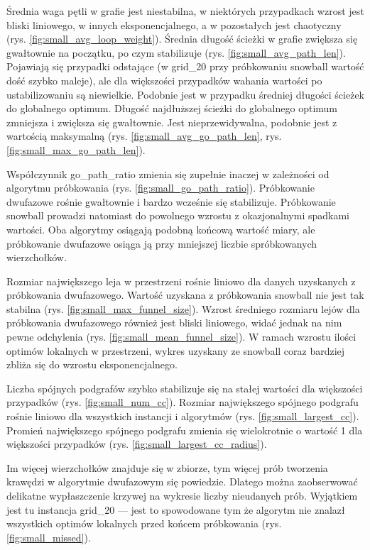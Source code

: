 Średnia waga pętli w grafie jest niestabilna, w niektórych przypadkach wzrost jest bliski liniowego, w innych
eksponencjalnego, a w pozostałych jest chaotyczny (rys. \ref{fig:small_avg_loop_weight}).
Średnia długość ścieżki w grafie zwiększa się gwałtownie na początku, po czym stabilizuje (rys. \ref{fig:small_avg_path_len}).
Pojawiają się przypadki odstające (w grid\_20 przy próbkowaniu snowball wartość dość szybko maleje),
ale dla większości przypadków wahania wartości po ustabilizowaniu są niewielkie.
Podobnie jest w przypadku średniej długości ścieżek do globalnego optimum.
Długość najdłuższej ścieżki do globalnego optimum zmniejsza i zwiększa się gwałtownie.
Jest nieprzewidywalna, podobnie jest z wartością maksymalną (rys. \ref{fig:small_avg_go_path_len}, rys. \ref{fig:small_max_go_path_len}).

Współczynnik go\_path\_ratio zmienia się zupełnie inaczej w zależności od algorytmu próbkowania (rys. \ref{fig:small_go_path_ratio}).
Próbkowanie dwufazowe rośnie gwałtownie i bardzo wcześnie się stabilizuje.
Próbkowanie snowball prowadzi natomiast do powolnego wzrostu z okazjonalnymi spadkami wartości.
Oba algorytmy osiągają podobną końcową wartość miary, ale próbkowanie dwufazowe osiąga ją przy mniejszej
liczbie spróbkowanych wierzchołków.

Rozmiar największego leja w przestrzeni rośnie liniowo dla danych uzyskanych z próbkowania
dwufazowego. Wartość uzyskana z próbkowania snowball nie jest tak stabilna (rys. \ref{fig:small_max_funnel_size}).
Wzrost średniego rozmiaru lejów dla próbkowania dwufazowego również jest bliski liniowego,
widać jednak na nim pewne odchylenia (rys. \ref{fig:small_mean_funnel_size}). W ramach wzrostu ilości optimów lokalnych w przestrzeni,
wykres uzyskany ze snowball coraz bardziej zbliża się do wzrostu eksponencjalnego.

Liczba spójnych podgrafów szybko stabilizuje się na stałej wartości dla większości przypadków (rys. \ref{fig:small_num_cc}).
Rozmiar największego spójnego podgrafu rośnie liniowo dla wszystkich instancji i algorytmów (rys. \ref{fig:small_largest_cc}).
Promień największego spójnego podgrafu zmienia się wielokrotnie o wartość 1 dla większości przypadków (rys. \ref{fig:small_largest_cc_radius}).

Im więcej wierzchołków znajduje się w zbiorze, tym więcej prób tworzenia krawędzi w algorytmie dwufazowym
się powiedzie. Dlatego można zaobserwować delikatne wypłaszczenie krzywej na wykresie liczby nieudanych prób.
Wyjątkiem jest tu instancja grid\_20  --- jest to spowodowane tym że algorytm nie znalazł wszystkich optimów
lokalnych przed końcem próbkowania (rys. \ref{fig:small_missed}).

